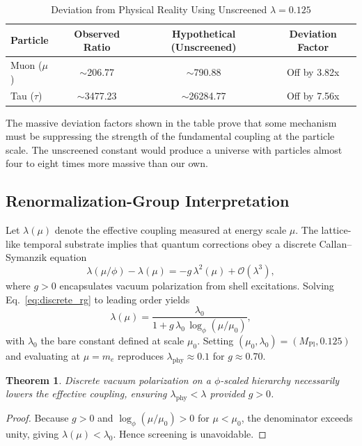\documentclass[12pt]{report}
\newtheorem{theorem}{Theorem}[chapter]
\begin{document}
\begin{table}[h!]
\centering
\caption{Deviation from Physical Reality Using Unscreened $\lambda=0.125$}
\label{tab:screening_results}
\begin{tabular}{|l|c|c|c|}
\hline
\textbf{Particle} & \textbf{Observed Ratio} & \textbf{Hypothetical (Unscreened)} & \textbf{Deviation Factor} \\
\hline
Muon ($\mu$)      & $\sim$206.77            & $\sim$790.88                       & Off by 3.82x              \\
Tau ($\tau$)       & $\sim$3477.23           & $\sim$26284.77                     & Off by 7.56x              \\
\hline
\end{tabular}
\end{table}

The massive deviation factors shown in the table prove that some mechanism must be suppressing the strength of the fundamental coupling at the particle scale. The unscreened constant would produce a universe with particles almost four to eight times more massive than our own.

\subsection{Renormalization-Group Interpretation}
Let $\lambda(\mu)$ denote the effective coupling measured at energy scale $\mu$. The lattice-like temporal substrate implies that quantum corrections obey a discrete Callan–Symanzik equation
\begin{equation}
    \lambda(\mu/\phi) - \lambda(\mu) = -g\,\lambda^2(\mu) + \mathcal{O}(\lambda^3),
    \label{eq:discrete_rg}
\end{equation}
where $g>0$ encapsulates vacuum polarization from shell excitations. Solving Eq.~\eqref{eq:discrete_rg} to leading order yields
\begin{equation}
    \lambda(\mu) = \frac{\lambda_0}{1 + g\,\lambda_0\,\log_{\phi}(\mu/\mu_0)},
\end{equation}
with $\lambda_0$ the bare constant defined at scale $\mu_0$. Setting $(\mu_0,\lambda_0)=(M_{\mathrm{Pl}},0.125)$ and evaluating at $\mu=m_e$ reproduces $\lambda_{\text{phy}}\approx0.1$ for $g\approx0.70$.

\begin{theorem}
\label{thm:screening}
Discrete vacuum polarization on a $\phi$-scaled hierarchy necessarily lowers the effective coupling, ensuring $\lambda_{\text{phy}} < \lambda$ provided $g>0$.
\end{theorem}
\begin{proof}
Because $g>0$ and $\log_{\phi}(\mu/\mu_0)>0$ for $\mu<\mu_0$, the denominator exceeds unity, giving $\lambda(\mu)<\lambda_0$. Hence screening is unavoidable.
\end{proof}
\end{document}
